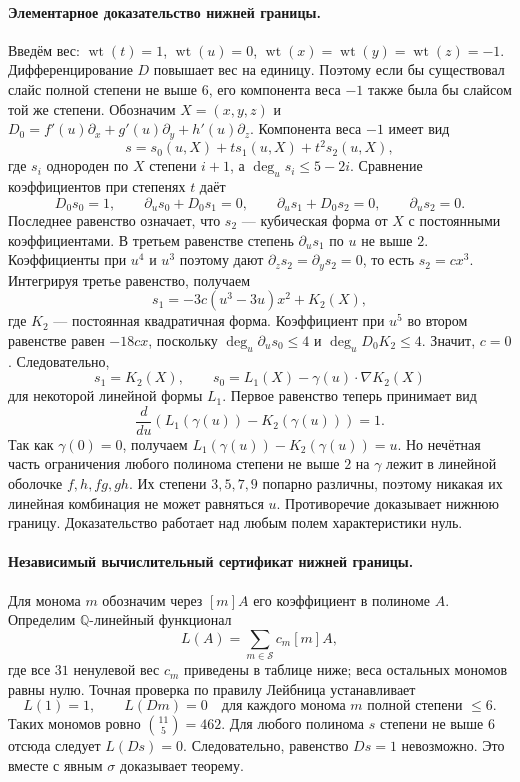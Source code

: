 \paragraph{Элементарное доказательство нижней границы.}
Введём вес: $\operatorname{wt}(t)=1$, $\operatorname{wt}(u)=0$,
$\operatorname{wt}(x)=\operatorname{wt}(y)=\operatorname{wt}(z)=-1$.
Дифференцирование $D$ повышает вес на единицу. Поэтому если бы существовал
слайс полной степени не выше $6$, его компонента веса $-1$ также была бы
слайсом той же степени. Обозначим $X=(x,y,z)$ и
$D_0=f'(u)\partial_x+g'(u)\partial_y+h'(u)\partial_z$.
Компонента веса $-1$ имеет вид
\[
 s=s_0(u,X)+t s_1(u,X)+t^2s_2(u,X),
\]
где $s_i$ однороден по $X$ степени $i+1$, а
$\deg_u s_i\leq 5-2i$. Сравнение коэффициентов при степенях $t$ даёт
\[
 D_0s_0=1,\qquad \partial_us_0+D_0s_1=0,\qquad
 \partial_us_1+D_0s_2=0,\qquad \partial_us_2=0.
\]
Последнее равенство означает, что $s_2$ --- кубическая форма от $X$
с постоянными коэффициентами. В третьем равенстве степень
$\partial_us_1$ по $u$ не выше $2$. Коэффициенты при $u^4$ и $u^3$
поэтому дают $\partial_zs_2=\partial_ys_2=0$, то есть $s_2=cx^3$.
Интегрируя третье равенство, получаем
\[
 s_1=-3c(u^3-3u)x^2+K_2(X),
\]
где $K_2$ --- постоянная квадратичная форма. Коэффициент при $u^5$
во втором равенстве равен $-18cx$, поскольку $\deg_u\partial_us_0\leq4$
и $\deg_u D_0K_2\leq4$. Значит, $c=0$. Следовательно,
\[
 s_1=K_2(X),\qquad
 s_0=L_1(X)-\gamma(u)\cdot\nabla K_2(X)
\]
для некоторой линейной формы $L_1$. Первое равенство теперь принимает вид
\[
 \frac{d}{du}\left(L_1(\gamma(u))-K_2(\gamma(u))\right)=1.
\]
Так как $\gamma(0)=0$, получаем
$L_1(\gamma(u))-K_2(\gamma(u))=u$.
Но нечётная часть ограничения любого полинома степени не выше $2$
на $\gamma$ лежит в линейной оболочке $f,h,fg,gh$.
Их степени $3,5,7,9$ попарно различны, поэтому никакая их линейная
комбинация не может равняться $u$. Противоречие доказывает нижнюю границу.
Доказательство работает над любым полем характеристики нуль.

\paragraph{Независимый вычислительный сертификат нижней границы.}
Для монома $m$ обозначим через $[m]A$ его коэффициент в полиноме $A$.
Определим $\mathbb Q$-линейный функционал
\[
 L(A)=\sum_{m\in\mathcal S} c_m[m]A,
\]
где все $31$ ненулевой вес $c_m$ приведены в таблице ниже;
веса остальных мономов равны нулю.
Точная проверка по правилу Лейбница устанавливает
\[
 L(1)=1,\qquad L(Dm)=0
 \quad\text{для каждого монома }m\text{ полной степени }\leq 6.
\]
Таких мономов ровно $\binom{11}{5}=462$.
Для любого полинома $s$ степени не выше $6$ отсюда следует $L(Ds)=0$.
Следовательно, равенство $Ds=1$ невозможно.
Это вместе с явным $\sigma$ доказывает теорему.


